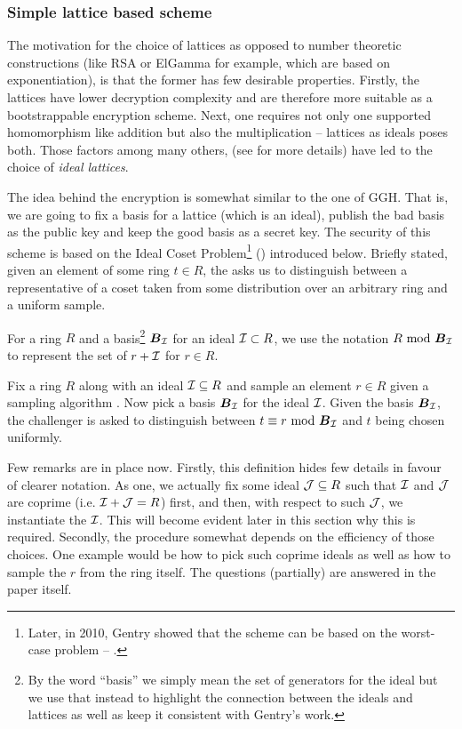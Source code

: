 \subsubsection{Simple lattice based scheme}
The motivation for the choice of lattices as opposed to number theoretic constructions (like RSA or ElGamma for example, which are based on exponentiation), is that the former has few desirable properties. Firstly, the lattices have lower decryption complexity and are therefore more suitable as a bootstrappable encryption scheme. Next, one requires not only one supported homomorphism like addition but also the multiplication -- lattices as ideals poses both. Those factors among many others, (see \cite{gentry} for more details) have led to the choice of \textit{ideal lattices}.

The idea behind the encryption is somewhat similar to the one of GGH. That is, we are going to fix a basis for a lattice (which is an ideal), publish the bad basis as the public key and keep the good basis as a secret key. The security of this scheme is based on the Ideal Coset Problem\footnote{Later, in 2010, Gentry showed that the scheme can be based on the worst-case  problem -- \cite{worst-case}.} () introduced below. Briefly stated, given an element of some ring $t \in R$, the  asks us to distinguish between a representative of a coset taken from some distribution over an arbitrary ring and a uniform sample.

For a ring $R$ and a basis\footnote{By the word ``basis'' we simply mean the set of generators for the ideal but we use that instead to highlight the connection between the ideals and lattices as well as keep it consistent with Gentry's work.} $\boldsymbol{B}_{\mathcal{I}}$ for an ideal $\mathcal{I} \subset R$, we use the notation $R \text{ mod } \boldsymbol{B}_{\mathcal{I}}$ to represent the set of $r + \mathcal{I}$ for $r \in R$.

\begin{definition}
	Fix a ring $R$ along with an ideal $\mathcal{I} \subseteq R$ and sample an element $r \in R$ given a sampling algorithm . Now pick a basis $\boldsymbol{B}_{\mathcal{I}}$ for the ideal $\mathcal{I}$. Given the basis $\boldsymbol{B}_{\mathcal{I}}$, the challenger is asked to distinguish between $t \equiv r \text{ mod } \boldsymbol{B}_{\mathcal{I}}$ and $t$ being chosen uniformly.
\end{definition}
Few remarks are in place now. Firstly, this definition hides few details in favour of clearer notation. As one, we actually fix some ideal $\mathcal{J} \subseteq R$ such that $\mathcal{I}$ and $\mathcal{J}$ are coprime (i.e. $\mathcal{I} + \mathcal{J} = R$) first, and then, with respect to such $\mathcal{J}$, we instantiate the $\mathcal{I}$. This will become evident later in this section why this is required. Secondly, the procedure somewhat depends on the efficiency of those choices. One example would be how to pick such coprime ideals as well as how to sample the $r$ from the ring itself. The questions (partially) are answered in the paper \cite{gentry_phd} itself.

